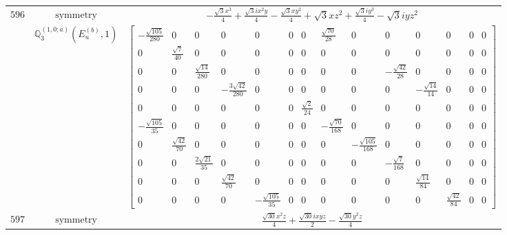 \documentclass[fleqn,8pt,landscape]{jsarticle}
\begin{document}
\begin{longtable}{ccc}
$ 596 $ & $ \text{symmetry} $ & $ - \frac{\sqrt{3} x^{3}}{4} + \frac{\sqrt{3} i x^{2} y}{4} - \frac{\sqrt{3} x y^{2}}{4} + \sqrt{3} x z^{2} + \frac{\sqrt{3} i y^{3}}{4} - \sqrt{3} i y z^{2} $ \\
$  $ & $ \mathbb{Q}_{3}^{(1,0;a)}(E_{u}^{(b)},1) $ & $ \begin{bmatrix} - \frac{\sqrt{105}}{280} & 0 & 0 & 0 & 0 & 0 & 0 & \frac{\sqrt{70}}{28} & 0 & 0 & 0 & 0 & 0 & 0 \\ 0 & \frac{\sqrt{7}}{40} & 0 & 0 & 0 & 0 & 0 & 0 & 0 & 0 & 0 & 0 & 0 & 0 \\ 0 & 0 & \frac{\sqrt{14}}{280} & 0 & 0 & 0 & 0 & 0 & 0 & - \frac{\sqrt{42}}{28} & 0 & 0 & 0 & 0 \\ 0 & 0 & 0 & - \frac{3 \sqrt{42}}{280} & 0 & 0 & 0 & 0 & 0 & 0 & - \frac{\sqrt{14}}{14} & 0 & 0 & 0 \\ 0 & 0 & 0 & 0 & 0 & 0 & \frac{\sqrt{2}}{24} & 0 & 0 & 0 & 0 & 0 & 0 & 0 \\ - \frac{\sqrt{105}}{35} & 0 & 0 & 0 & 0 & 0 & 0 & - \frac{\sqrt{70}}{168} & 0 & 0 & 0 & 0 & 0 & 0 \\ 0 & \frac{\sqrt{42}}{70} & 0 & 0 & 0 & 0 & 0 & 0 & - \frac{\sqrt{105}}{168} & 0 & 0 & 0 & 0 & 0 \\ 0 & 0 & \frac{2 \sqrt{21}}{35} & 0 & 0 & 0 & 0 & 0 & 0 & - \frac{\sqrt{7}}{168} & 0 & 0 & 0 & 0 \\ 0 & 0 & 0 & \frac{\sqrt{42}}{70} & 0 & 0 & 0 & 0 & 0 & 0 & \frac{\sqrt{14}}{84} & 0 & 0 & 0 \\ 0 & 0 & 0 & 0 & - \frac{\sqrt{105}}{35} & 0 & 0 & 0 & 0 & 0 & 0 & \frac{\sqrt{42}}{84} & 0 & 0 \end{bmatrix} $ \\ \hline
$ 597 $ & $ \text{symmetry} $ & $ \frac{\sqrt{30} x^{2} z}{4} + \frac{\sqrt{30} i x y z}{2} - \frac{\sqrt{30} y^{2} z}{4} $ \\

\end{longtable}
\end{document}
